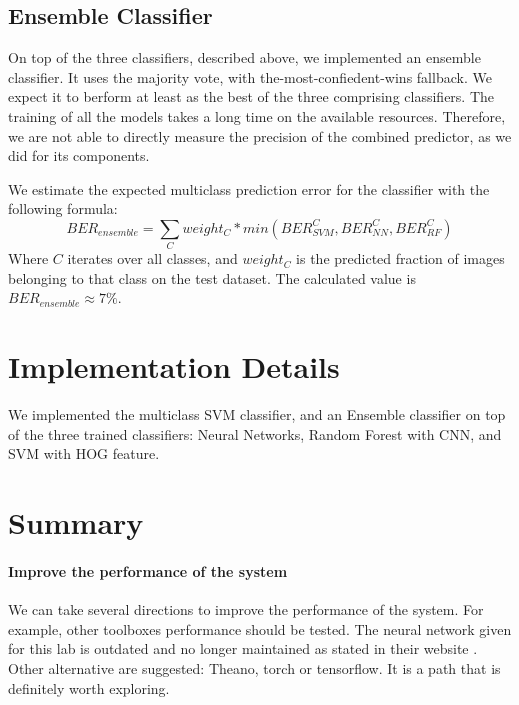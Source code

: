\documentclass{article} %
\begin{document}
\subsection{Ensemble Classifier}

On top of the three classifiers, described above, we implemented an ensemble classifier. It uses the majority vote, with the-most-confiedent-wins fallback. We expect it to berform at least as the best of the three comprising classifiers. The training of all the models takes a long time on the available resources. Therefore, we are not able to directly measure the precision of the combined predictor, as we did for its components.

We estimate the expected multiclass prediction error for the classifier with the following formula:
\[
BER_{ensemble} = \sum_C weight_C*min(BER_{SVM}^C, BER_{NN}^C, BER_{RF}^C)
\]
Where $C$ iterates over all classes, and $weight_C$ is the predicted fraction of images belonging to that class on the test dataset. The calculated value is $BER_{ensemble} \approx 7\%$.

\section{Implementation Details}

We implemented the multiclass SVM classifier, and an Ensemble classifier on top of the three trained classifiers: Neural Networks, Random Forest with CNN, and SVM with HOG feature.







\section{Summary}



\paragraph{Improve the performance of the system}
We can take several directions to improve the performance of the system.
For example, other toolboxes performance should be tested. The neural network given for this lab is outdated and no longer maintained as stated in their website \cite{deeplearningtoolbox}. Other alternative are suggested: Theano, torch or tensorflow. It is a path that is definitely worth exploring.
\end{document}
